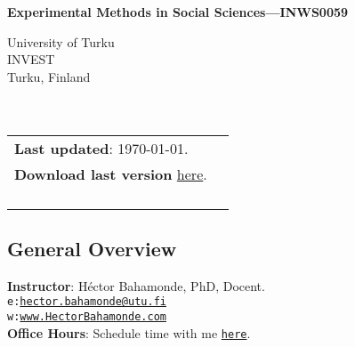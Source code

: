 \documentclass[letterpaper]{article}
\def\name{Experimental Methods in Social Sciences---INWS0059}
\begin{document}

\centerline{\huge \bf \name}



\vspace{0.25in}

\begin{minipage}{0.45\linewidth}
 University of Turku \\
  INVEST \\
  Turku, Finland\\
  \\
  \\

\end{minipage}
\hspace{4cm}\begin{minipage}{0.45\linewidth}
  \begin{tabular}{ll}
{\bf Last updated}: \today. \\
 {\bf Download last version} \href{https://github.com/hbahamonde/Exp_Soc_Science/raw/main/Bahamonde_Exp_Soc_Sci.pdf}{here}.%
    \\
    \\
    \\
    \\
    \\
  \end{tabular}
\end{minipage}

\subsection*{General Overview}


\vspace{1mm}
{\bf Instructor}: H\'ector Bahamonde, PhD, Docent.\\
\texttt{e:}\href{mailto:hector.bahamonde@utu.fi}{\texttt{hector.bahamonde@utu.fi}}\\
\texttt{w:}\href{http://www.hectorbahamonde.com}{\texttt{www.HectorBahamonde.com}}\\
{\bf Office Hours}: Schedule time with me \href{https://calendly.com/bahamonde}{\texttt{here}}.\\
\end{document}
